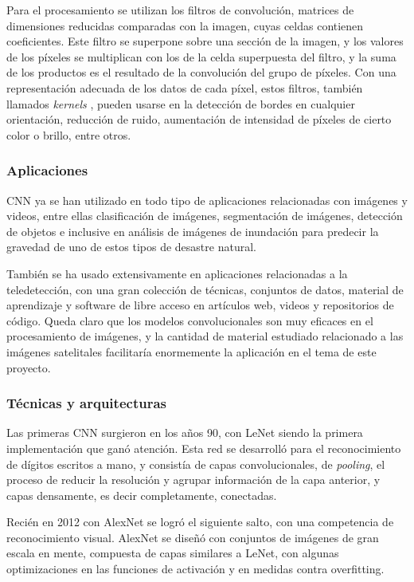Para el procesamiento se utilizan los filtros de convolución, matrices de dimensiones reducidas comparadas con la imagen, cuyas celdas contienen coeficientes. Este filtro se superpone sobre una sección de la imagen, y los valores de los píxeles se multiplican con los de la celda superpuesta del filtro, y la suma de los productos es el resultado de la convolución del grupo de píxeles. Con una representación adecuada de los datos de cada píxel, estos filtros, también llamados {\it kernels }, pueden usarse en la detección de bordes en cualquier orientación, reducción de ruido, aumentación de intensidad de píxeles de cierto color o brillo, entre otros. \autocite{ciresan-cnn}

\subsubsection{Aplicaciones}

CNN ya se han utilizado en todo tipo de aplicaciones relacionadas con imágenes y videos, entre ellas clasificación de imágenes, segmentación de imágenes, detección de objetos e inclusive en análisis de imágenes de inundación para predecir la gravedad de uno de estos tipos de desastre natural. \autocite{pally2022105285}

También se ha usado extensivamente en aplicaciones relacionadas a la teledetección, con una gran colección de técnicas, conjuntos de datos, material de aprendizaje y software de libre acceso en artículos web, videos y repositorios de código. \autocite{tds-landuse-classification} \autocite{repo-satellite-image-dl} Queda claro que los modelos convolucionales son muy eficaces en el procesamiento de imágenes, y la cantidad de material estudiado relacionado a las imágenes satelitales facilitaría enormemente la aplicación en el tema de este proyecto.

\subsubsection{Técnicas y arquitecturas}

Las primeras CNN surgieron en los años 90, con LeNet siendo la primera implementación que ganó atención. Esta red se desarrolló para el reconocimiento de dígitos escritos a mano, y consistía de capas convolucionales, de {\it pooling}, el proceso de reducir la resolución y agrupar información de la capa anterior, y capas densamente, es decir completamente, conectadas.

Recién en 2012 con AlexNet se logró el siguiente salto, con una competencia de reconocimiento visual. AlexNet se diseñó con conjuntos de imágenes de gran escala en mente, compuesta de capas similares a LeNet, con algunas optimizaciones en las funciones de activación y en medidas contra overfitting.

